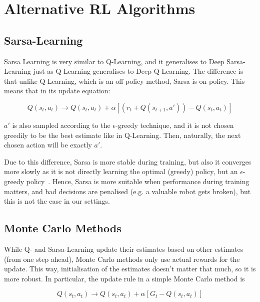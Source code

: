 \chapter{Alternative RL Algorithms}\label{alternativeRL} 



\section{Sarsa-Learning}

Sarsa Learning is very similar to Q-Learning, and it generalises to Deep Sarsa-Learning just as Q-Learning generalises to Deep Q-Learning. The difference is that unlike Q-Learning, which is an off-policy method, Sarsa is on-policy. This means that in its update equation:

\begin{equation} \label{eq:sarsa-learningUpdate}
Q(s_t,a_t) \longrightarrow Q(s_t,a_t) + \alpha[( r_t + Q(s_{t+1}, a')) - Q(s_t,a_t)]
\end{equation}

$a'$ is also sampled according to the $\epsilon$-greedy technique, and it is not chosen greedily to be the best estimate like in Q-Learning. Then, naturally, the next chosen action will be exactly $a'$.

Due to this difference, Sarsa is more stable during training, but also it converges more slowly as it is not directly learning the optimal (greedy) policy, but an $\epsilon$-greedy policy~\cite{sutton2018RLbook}. Hence, Sarsa is more suitable when performance during training matters, and bad decisions are penalised (e.g. a valuable robot gets broken), but this is not the case in our settings.

\section{Monte Carlo Methods}


While Q- and Sarsa-Learning update their estimates based on other estimates (from one step ahead), Monte Carlo methods only use actual rewards for the update. This way, initialisation of the estimates doesn't matter that much, so it is more robust. In particular, the update rule in a simple Monte Carlo method is

\begin{equation} \label{eq:monte-carloUpdate}
Q(s_t,a_t) \longrightarrow Q(s_t,a_t) + \alpha[G_t - Q(s_t,a_t)]
\end{equation}

